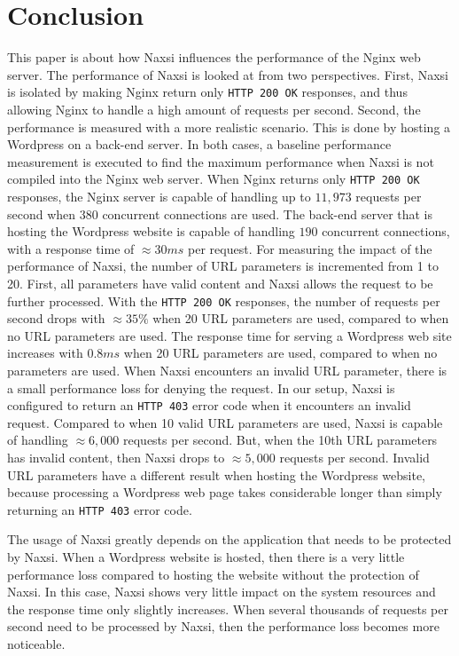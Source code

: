 \documentclass[Conclusion]{subfiles}
\begin{document}
\section{Conclusion}
\label{sec:Conclusion}
This paper is about how Naxsi influences the performance of the \mbox{Nginx} web server. The performance of Naxsi is looked at from two perspectives. First, Naxsi is isolated by making Nginx return only \verb+HTTP 200 OK+ responses, and thus allowing Nginx to handle a high amount of requests per second. Second, the performance is measured with a more realistic scenario. This is done by hosting a Wordpress on a back-end server. In both cases, a baseline performance measurement is executed to find the maximum performance when Naxsi is not compiled into the Nginx web server. When Nginx returns only \verb+HTTP 200 OK+ responses, the Nginx server is capable of handling up to $11,973$ requests per second when $380$ concurrent connections are used. The back-end server that is hosting the Wordpress website is capable of handling $190$ concurrent connections, with a response time of $\approx 30 ms$ per request. For measuring the impact of the performance of Naxsi, the number of URL parameters is incremented from 1 to 20. First, all parameters have valid content and Naxsi allows the request to be further processed. With the \verb+HTTP 200 OK+ responses, the number of requests per second drops with $\approx 35\%$ when 20 URL parameters are used, compared to when no URL parameters are used. The response time for serving a Wordpress web site increases with $0.8 ms$ when 20 URL parameters are used, compared to when no parameters are used. When Naxsi encounters an invalid URL parameter, there is a small performance loss for denying the request. In our setup, Naxsi is configured to return an \verb+HTTP 403+ error code when it encounters an invalid request. Compared to when 10 valid URL parameters are used, Naxsi is capable of handling $\approx 6,000$ requests per second. But, when the 10th URL parameters has invalid content, then Naxsi drops to $\approx 5,000$ requests per second. Invalid URL parameters have a different result when hosting the Wordpress website, because processing a Wordpress web page takes considerable longer than simply returning an \verb+HTTP 403+ error code.

The usage of Naxsi greatly depends on the application that needs to be protected by Naxsi. When a Wordpress website is hosted, then there is a very little performance loss compared to hosting the website without the protection of Naxsi. In this case, Naxsi shows very little impact on the system resources and the response time only slightly increases. When several thousands of requests per second need to be processed by Naxsi, then the performance loss becomes more noticeable. 
\end{document}
